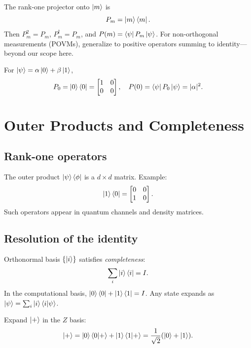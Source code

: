 The rank-one projector onto $\ket{m}$ is
\begin{equation}
P_m=\ket{m}\bra{m}.
\label{eq:projector}
\end{equation}
Then $P_m^2=P_m$, $P_m^\dagger=P_m$, and $P(m)=\bra{\psi}P_m\ket{\psi}$. For non-orthogonal measurements (POVMs), generalize to positive operators summing to identity---beyond our scope here.

\begin{example}
For $\ket{\psi}=\alpha\ket{0}+\beta\ket{1}$,
\[
P_0=\ket{0}\bra{0}=\begin{bmatrix}1&0\\0&0\end{bmatrix},\quad
P(0)=\bra{\psi}P_0\ket{\psi}=|\alpha|^2.
\]
\end{example}

\section{Outer Products and Completeness}
\label{sec:outer-completeness}

\subsection{Rank-one operators}

The outer product $\ket{\psi}\bra{\phi}$ is a $d\times d$ matrix. Example:
\begin{equation}
\ket{1}\bra{0}=\begin{bmatrix}0&0\\1&0\end{bmatrix}.
\label{eq:outer-product}
\end{equation}
Such operators appear in quantum channels and density matrices.

\subsection{Resolution of the identity}

Orthonormal basis $\{\ket{i}\}$ satisfies \emph{completeness}:
\begin{equation}
\sum_i \ket{i}\bra{i}=I.
\label{eq:completeness}
\end{equation}
In the computational basis, $\ket{0}\bra{0}+\ket{1}\bra{1}=I$. Any state expands as $\ket{\psi}=\sum_i \ket{i}\braket{i|\psi}$.

\begin{example}
Expand $\ket{+}$ in the $Z$ basis:
\[
\ket{+}=\ket{0}\braket{0|+}+\ket{1}\braket{1|+}=\frac{1}{\sqrt{2}}(\ket{0}+\ket{1}).
\]
\end{example}

